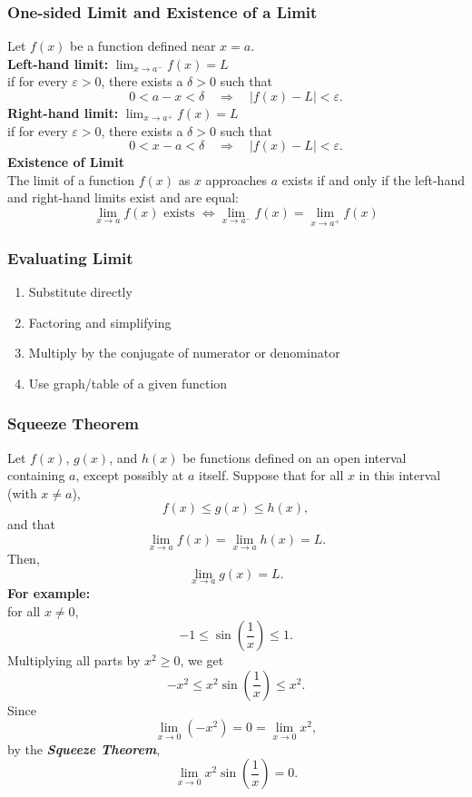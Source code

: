 \documentclass[11pt]{article}
\begin{document}
\subsubsection{One-sided Limit and Existence of a Limit}
Let $f(x)$ be a function defined near $x = a$.\\[.5em]
\textbf{Left-hand limit:}  
$
    \displaystyle
    \lim_{x \to a^-}f(x) = L
$\\
if for every $\varepsilon > 0$, there exists a $\delta > 0$ such that
\[
    0<a-x<\delta\quad\Rightarrow\quad|f(x)-L|<\varepsilon.
\]
\noindent
\textbf{Right-hand limit:}
$
    \displaystyle
    \lim_{x \to a^+} f(x) = L
$\\
if for every $\varepsilon > 0$, there exists a $\delta > 0$ such that
\[
    0<x-a<\delta\quad\Rightarrow\quad|f(x)-L|<\varepsilon.
\]
\textbf{Existence of Limit}\\
The limit of a function $f(x)$ as $x$ approaches $a$ exists if and only if the left-hand and right-hand limits exist and are equal:
\[
    \lim_{x \to a} f(x) \text{ exists } \iff \lim_{x \to a^-} f(x) = \lim_{x \to a^+} f(x)
\]
\subsubsection{Evaluating Limit}
\begin{enumerate}
    \item Substitute directly
    \item Factoring and simplifying
    \item Multiply by the conjugate of numerator or denominator
    \item Use graph/table of a given function
\end{enumerate}
\subsubsection{Squeeze Theorem}
Let $f(x)$, $g(x)$, and $h(x)$ be functions defined on an open interval containing $a$, 
except possibly at $a$ itself. Suppose that for all $x$ in this interval (with $x \ne a$),
\[f(x) \le g(x) \le h(x),\]
and that\[\lim_{x \to a} f(x) = \lim_{x \to a} h(x) = L.\] 
Then,\[\lim_{x \to a} g(x) = L.\]
\bigskip
\noindent
\textbf{For example:}\\
for all $x \ne 0$,
\[
-1 \le \sin\left(\frac{1}{x}\right) \le 1.
\]
Multiplying all parts by $x^2 \ge 0$, we get
\[-x^2 \le x^2 \sin\left(\frac{1}{x}\right) \le x^2.\]
Since
\[\lim_{x \to 0} (-x^2) = 0 = \lim_{x \to 0} x^2,\]
by the \textbf{\textit{Squeeze Theorem}},
\[\lim_{x \to 0} x^2 \sin\left(\frac{1}{x}\right) = 0.\]
\end{document}
